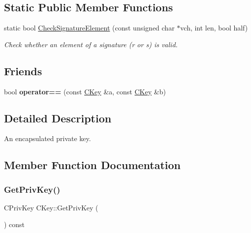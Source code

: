 \subsection*{Static Public Member Functions}
\begin{DoxyCompactItemize}
\item 
\mbox{\label{class_c_key_a625c363d9adfbd4dda22f3a67a898cf4}} 
static bool \mbox{\hyperlink{class_c_key_a625c363d9adfbd4dda22f3a67a898cf4}{Check\+Signature\+Element}} (const unsigned char $\ast$vch, int len, bool half)
\begin{DoxyCompactList}\small\item\em Check whether an element of a signature (r or s) is valid. \end{DoxyCompactList}\end{DoxyCompactItemize}
\subsection*{Friends}
\begin{DoxyCompactItemize}
\item 
\mbox{\label{class_c_key_a381efd9184dc467e73e690329c70371d}} 
bool {\bfseries operator==} (const \mbox{\hyperlink{class_c_key}{C\+Key}} \&a, const \mbox{\hyperlink{class_c_key}{C\+Key}} \&b)
\end{DoxyCompactItemize}


\subsection{Detailed Description}
An encapsulated private key. 

\subsection{Member Function Documentation}
\mbox{\label{class_c_key_a91b6ecf71cc16e0b05ce79ec9276e729}} 
\subsubsection{\texorpdfstring{GetPrivKey()}{GetPrivKey()}}
{\footnotesize\ttfamily C\+Priv\+Key C\+Key\+::\+Get\+Priv\+Key (\begin{DoxyParamCaption}{ }\end{DoxyParamCaption}) const}

